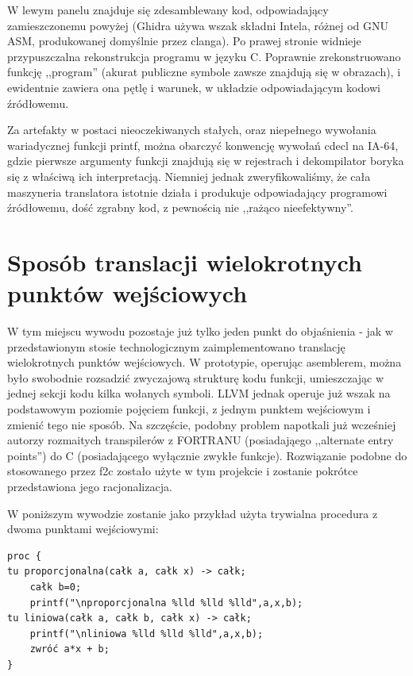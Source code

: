 W lewym panelu znajduje się zdesamblewany kod, odpowiadający zamieszczonemu powyżej (Ghidra używa wszak składni Intela, różnej od GNU ASM, produkowanej domyślnie przez clanga). Po prawej stronie widnieje przypuszczalna rekonstrukcja programu w języku C. Poprawnie zrekonstruowano funkcję ,,program'' (akurat publiczne symbole zawsze znajdują się w obrazach), i ewidentnie zawiera ona pętlę i warunek, w układzie odpowiadającym kodowi źródłowemu. 

Za artefakty w postaci nieoczekiwanych stałych, oraz niepełnego wywołania wariadycznej funkcji printf, można obarczyć konwencję wywołań cdecl na IA-64, gdzie pierwsze argumenty funkcji znajdują się w rejestrach i dekompilator boryka się z właściwą ich interpretacją.
Niemniej jednak zweryfikowaliśmy, że cała maszyneria translatora istotnie działa i produkuje odpowiadający programowi źródłowemu, dość zgrabny kod, z pewnością nie ,,rażąco nieefektywny''.

\section{Sposób translacji wielokrotnych punktów wejściowych}
W tym miejscu wywodu pozostaje już tylko jeden punkt do objaśnienia - jak w przedstawionym stosie technologicznym zaimplementowano translację wielokrotnych punktów wejściowych. W prototypie, operując asemblerem, można było swobodnie rozsadzić zwyczajową strukturę kodu funkcji, umieszczając w jednej sekcji kodu kilka wołanych symboli. LLVM jednak operuje już wszak na podstawowym poziomie pojęciem funkcji, z jednym punktem wejściowym i zmienić tego nie sposób. Na szczęście, podobny problem napotkali już wcześniej autorzy rozmaitych transpilerów z FORTRANU (posiadająego ,,alternate entry points'') do C (posiadającego wyłącznie zwykłe funkcje)\cite{gpp_entry_points}. Rozwiązanie podobne do stosowanego przez f2c zostało użyte w tym projekcie i zostanie pokrótce przedstawiona jego racjonalizacja.

W poniższym wywodzie zostanie jako przykład użyta trywialna procedura z dwoma punktami wejściowymi:
\begin{lstlisting}
proc {
tu proporcjonalna(całk a, całk x) -> całk;
	całk b=0;
	printf("\nproporcjonalna %lld %lld %lld",a,x,b);
tu liniowa(całk a, całk b, całk x) -> całk;
	printf("\nliniowa %lld %lld %lld",a,x,b);
	zwróć a*x + b;
}
\end{lstlisting}

